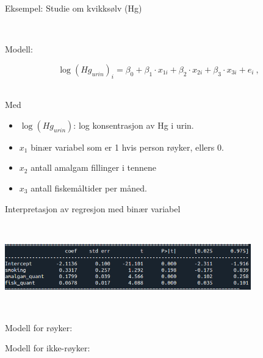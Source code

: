 \documentclass[10pt,ignorenonframetext,]{beamer}
\providecommand{\tightlist}{%
  \setlength{\itemsep}{0pt}\setlength{\parskip}{0pt}}
\begin{document}
\begin{frame}

\begin{block}{Eksempel: Studie om kvikksølv (Hg)}

\(~\)

Modell:

\[
\log(Hg_{urin})_i  = \beta_0 +  \beta_1 \cdot x_{1i} +  \beta_2\cdot x_{2i} + \beta_3 \cdot x_{3i} + e_i \ ,
\] \(~\)

Med

\begin{itemize}
\tightlist
\item
  \(\log(Hg_{urin})\): log konsentrasjon av Hg i urin.
\item
  \(x_{1}\) binær variabel som er 1 hvis person røyker, ellers 0.
\item
  \(x_{2}\) antall amalgam fillinger i tennene
\item
  \(x_{3}\) antall fiskemåltider per måned.
\end{itemize}

\end{block}

\end{frame}

\begin{frame}

\begin{block}{Interpretasjon av regresjon med binær variabel}

\(~\)

\includegraphics[width=0.8\textwidth,height=\textheight]{binaer_variabel.png}

\(~\)

Modell for røyker:

\vspace{15mm}

Modell for ikke-røyker:

\end{block}

\end{frame}
\end{document}
